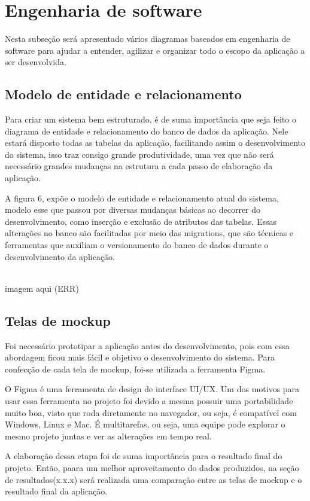 \section{Engenharia de software}
Nesta subseção será apresentado vários diagramas baseados em engenharia de software para ajudar a entender, agilizar e organizar todo o escopo da aplicação a ser desenvolvida.

\subsection{Modelo de entidade e relacionamento}
Para criar um sistema bem estruturado, é de suma importância que seja feito o diagrama de entidade e relacionamento do banco de dados da aplicação. Nele estará disposto todas as tabelas da aplicação, facilitando assim o desenvolvimento do sistema, isso traz consigo grande produtividade, uma vez que não será necessário grandes mudanças na estrutura a cada passo de elaboração da aplicação.

A figura 6, expõe o modelo de entidade e relacionamento atual do sistema, modelo esse que passou por diversas mudanças básicas ao decorrer do desenvolvimento, como inserção e exclusão de atributos das tabelas. Essas alterações no banco são facilitadas por meio das migrations, que são técnicas e ferramentas que auxiliam o versionamento do banco de dados durante o desenvolvimento da aplicação.

\\ imagem aqui (ERR)

\subsection{Telas de mockup}
Foi necessário prototipar a aplicação antes do desenvolvimento, pois com essa abordagem ficou mais fácil e objetivo o desenvolvimento do sistema. Para confecção de cada tela de mockup, foi-se utilizada a ferramenta Figma.

O Figma é uma ferramenta de design de interface UI/UX. Um dos motivos para usar essa ferramenta no projeto foi devido a mesma possuir uma portabilidade muito boa, visto que roda diretamente no navegador, ou seja, é compatível com Windows, Linux e Mac. É multitarefas, ou seja, uma equipe pode explorar o mesmo projeto juntas e ver as alterações em tempo real.

A elaboração dessa etapa foi de suma importância para o resultado final do projeto. Então, paara um melhor aproveitamento do dados produzidos, na seção de resultados(x.x.x) será realizada uma comparação entre as telas de mockup e o resultado final da aplicação.

